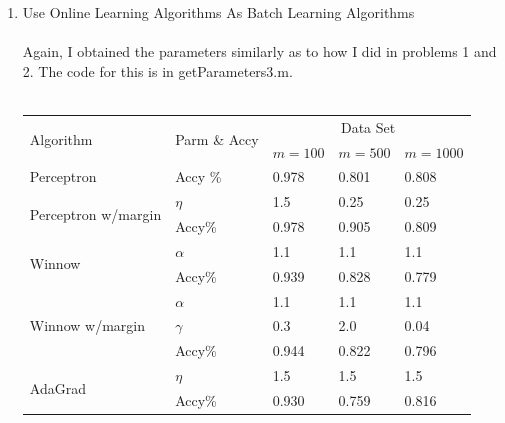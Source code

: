 \begin{enumerate}
\item Use Online Learning Algorithms As Batch Learning Algorithms\\\\
Again, I obtained the parameters similarly as to how I did in problems 1 and 2. The code for this is in getParameters3.m.\\\\
      \begin{center}
  \begin{table}[H]
    \begin{tabular}{|p{4.3cm}<{\centering}|p{2.5cm}<{\centering}|p{2.7cm}<{\centering}|p{2.7cm}<{\centering}|p{2.7cm}<{\centering}|}
      \hline
      \multirow{2}{*}{Algorithm} & \multirow{2}{*}{Parm \& Accy} & \multicolumn{3}{|c|}{Data Set} \\
      \cline{3-5}
 & & $m=100$& $m=500$& $m=1000$\\
 \hline
      Perceptron    & Accy \%               &0.978                             &0.801   &0.808                               \\ \hline
      \multirow{2}{*}{Perceptron w/margin} &          $\eta$          &1.5                   &0.25     &0.25                              \\
      \cline{2-5}
      & Accy\% &0.978  &0.905 &0.809 \\ \hline \hline
      \multirow{2}{*}{Winnow}               &     $\alpha$           &1.1                     &1.1         &1.1                           \\
      \cline{2-5}
      & Accy\% &0.939  &0.828 & 0.779\\ \hline \hline
      \multirow{3}{*}{Winnow w/margin}     & $\alpha$&1.1                                     &1.1     &1.1                \\
      \cline{2-5}
      & $\gamma$ &0.3  &2.0 & 0.04\\
      \cline{2-5}
            & Accy\% &0.944  &0.822 & 0.796\\ \hline \hline
      \multirow{2}{*}{AdaGrad}             & $\eta$&1.5                                      &1.5               &1.5                     \\
      \cline{2-5}
      & Accy\% &0.930  &0.759 & 0.816\\ \hline %
    \end{tabular}
    \end{table}
    \end{center}


\end{enumerate}
